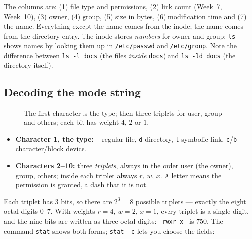 \documentclass[11pt,a4paper]{article}
\newcommand{\cmd}[1]{\texttt{#1}}
\begin{document}


The columns are: (1) file type and permissions, (2) link count (Week~7, Week~10), (3) owner, (4) group, (5) size in bytes, (6) modification time and (7) the name. Everything except the name comes from the inode; the name comes from the directory entry. The inode stores \emph{numbers} for owner and group; \cmd{ls} shows names by looking them up in \texttt{/etc/passwd} and \texttt{/etc/group}. Note the difference between \cmd{ls -l docs} (the files \emph{inside} \texttt{docs}) and \cmd{ls -ld docs} (the directory itself).

\subsection{Decoding the mode string}

\begin{figure}[H]
\centering
{}
\caption{The first character is the type; then three triplets for user, group and others; each bit has weight $4$, $2$ or $1$.}
\label{fig:mode}
\end{figure}

\begin{itemize}
  \item \textbf{Character 1, the type:} \texttt{-} regular file, \texttt{d} directory, \texttt{l} symbolic link, \texttt{c}/\texttt{b} character/block device.
  \item \textbf{Characters 2--10:} three \emph{triplets}, always in the order user (the owner), group, others; inside each triplet always $r$, $w$, $x$. A letter means the permission is granted, a dash that it is not.
\end{itemize}
Each triplet has $3$ bits, so there are $2^3 = 8$ possible triplets --- exactly the eight octal digits $0$--$7$. With weights $r = 4$, $w = 2$, $x = 1$, every triplet is a single digit, and the nine bits are written as three octal digits: \texttt{-rwxr-x---} is $750$. The command \cmd{stat} shows both forms; \cmd{stat -c} lets you choose the fields:
\end{document}
